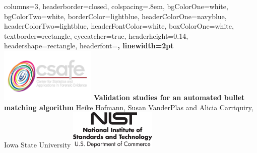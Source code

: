 \documentclass[landscape,a0paper,fontscale=0.275, margin = 25mm]{baposter} %
\begin{document}
\begin{poster}
{
columns=3,
headerborder=closed, %
colspacing=.8em, %
bgColorOne=white, %
bgColorTwo=white, %
borderColor=lightblue, %
headerColorOne=navyblue, %
headerColorTwo=lightblue, %
headerFontColor=white, %
boxColorOne=white, %
textborder=rectangle, %
eyecatcher=true, %
headerheight=0.14\textheight, %
headershape=rectangle, %
headerfont=\Large\bf, %
linewidth=2pt %
}
%
{\includegraphics[height=7em]{logo.png}} %
{\huge\bf Validation studies for an automated bullet matching algorithm\vspace{0.3em}} %
{{\Large Heike Hofmann, Susan VanderPlas and Alicia Carriquiry, Iowa State University}\vspace*{-0.6em}} %
{\includegraphics[height=5em]{logo-NIST.jpg}} %


\end{poster}
\end{document}
